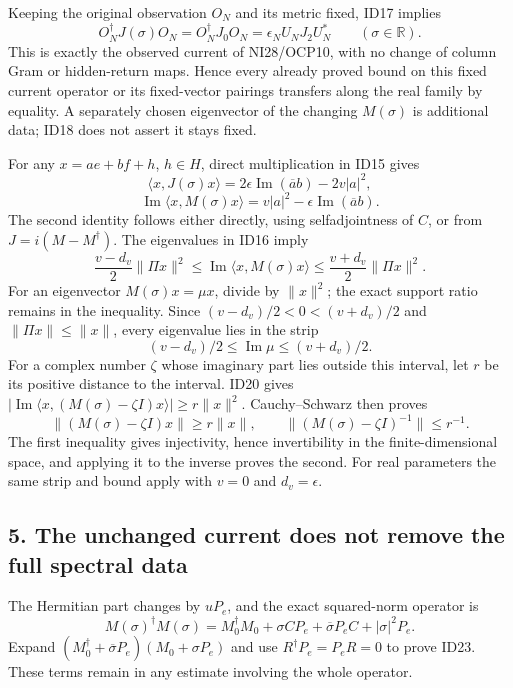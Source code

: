 \documentclass[
]{article}
\begin{document}
Keeping the original observation \(O_N\) and its metric fixed, ID17
implies \[
O_N^\dagger J(\sigma)O_N=O_N^\dagger J_0O_N
=\epsilon_NU_NJ_2U_N^*\qquad(\sigma\in\mathbb R).
\tag{ID18}
\] This is exactly the observed current of NI28/OCP10, with no change of
column Gram or hidden-return maps. Hence every already proved bound on
this fixed current operator or its fixed-vector pairings transfers along
the real family by equality. A separately chosen eigenvector of the
changing \(M(\sigma)\) is additional data; ID18 does not assert it stays
fixed.

For any \(x=ae+bf+h\), \(h\in H\), direct multiplication in ID15 gives
\[
\langle x,J(\sigma)x\rangle
=2\epsilon\operatorname{Im}(\overline a b)-2v|a|^2,
\] \[
\operatorname{Im}\langle x,M(\sigma)x\rangle
=v|a|^2-\epsilon\operatorname{Im}(\overline a b).
\tag{ID19}
\] The second identity follows either directly, using selfadjointness of
\(C\), or from \(J=i(M-M^\dagger)\). The eigenvalues in ID16 imply \[
\frac{v-d_v}{2}\|\Pi x\|^2
\le\operatorname{Im}\langle x,M(\sigma)x\rangle
\le\frac{v+d_v}{2}\|\Pi x\|^2.
\tag{ID20}
\] For an eigenvector \(M(\sigma)x=\mu x\), divide by \(\|x\|^2\); the
exact support ratio remains in the inequality. Since
\((v-d_v)/2<0<(v+d_v)/2\) and \(\|\Pi x\|\le\|x\|\), every eigenvalue
lies in the strip \[
(v-d_v)/2\le\operatorname{Im}\mu\le(v+d_v)/2.
\tag{ID21}
\] For a complex number \(\zeta\) whose imaginary part lies outside this
interval, let \(r\) be its positive distance to the interval. ID20 gives
\(|\operatorname{Im}\langle x,(M(\sigma)-\zeta I)x\rangle|\ge r\|x\|^2\).
Cauchy--Schwarz then proves \[
\|(M(\sigma)-\zeta I)x\|\ge r\|x\|,
\qquad\|(M(\sigma)-\zeta I)^{-1}\|\le r^{-1}.
\tag{ID22}
\] The first inequality gives injectivity, hence invertibility in the
finite-dimensional space, and applying it to the inverse proves the
second. For real parameters the same strip and bound apply with \(v=0\)
and \(d_v=\epsilon\).

\subsection{5. The unchanged current does not remove the full spectral
data}\label{the-unchanged-current-does-not-remove-the-full-spectral-data}

The Hermitian part changes by \(uP_e\), and the exact squared-norm
operator is \[
M(\sigma)^\dagger M(\sigma)
=M_0^\dagger M_0+\sigma CP_e+\overline\sigma P_eC+|\sigma|^2P_e.
\tag{ID23}
\] Expand \((M_0^\dagger+\overline\sigma P_e)(M_0+\sigma P_e)\) and use
\(R^\dagger P_e=P_eR=0\) to prove ID23. These terms remain in any
estimate involving the whole operator.
\end{document}
